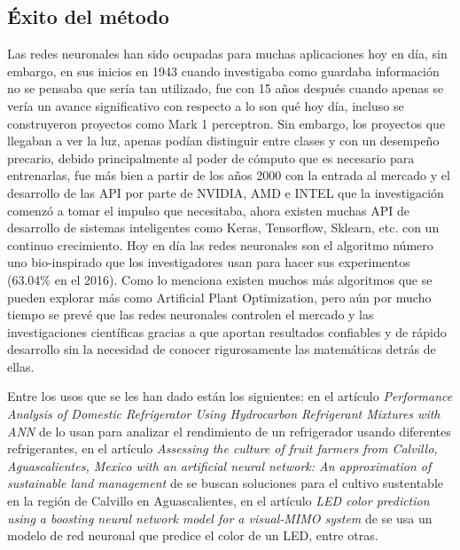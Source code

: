 \subsection{Éxito del método}

\par Las redes neuronales han sido ocupadas para muchas aplicaciones hoy en día, sin embargo, en sus inicios en 1943 cuando \textcite{mcculloch1943logical} investigaba como guardaba información no se pensaba que sería tan utilizado, fue con \textcite{rosenblatt1958perceptron} 15 años después cuando apenas se vería un avance significativo con respecto a lo son qué hoy día, incluso se construyeron proyectos como Mark 1 perceptron. Sin embargo, los proyectos que llegaban a ver la luz, apenas podían distinguir entre clases y con un desempeño precario, debido principalmente al poder de cómputo que es necesario para entrenarlas, fue más bien a partir de los años 2000 con la entrada al mercado y el desarrollo de las API por parte de NVIDIA, AMD e INTEL que la investigación comenzó a tomar el impulso que necesitaba, ahora existen muchas API de desarrollo de sistemas inteligentes como Keras, Tensorflow, Sklearn, etc. con un continuo crecimiento. Hoy en día las redes neuronales son el algoritmo número uno bio-inspirado que los investigadores usan para hacer sus experimentos (63.04\% en el 2016). Como lo menciona \textcite{kar2016bio} existen muchos más algoritmos que se pueden explorar más como Artificial Plant Optimization, pero aún por mucho tiempo se prevé que las redes neuronales controlen el mercado y las investigaciones científicas gracias a que aportan resultados confiables y de rápido desarrollo sin la necesidad de conocer rigurosamente las matemáticas detrás de ellas.

\par Entre los usos que se les han dado están los siguientes: en el artículo \textit{Performance Analysis of Domestic Refrigerator Using Hydrocarbon Refrigerant Mixtures with ANN} de \textcite{reddy2019performance} lo usan para analizar el rendimiento de un refrigerador usando diferentes refrigerantes, en el artículo \textit{Assessing the culture of fruit farmers from Calvillo, Aguascalientes, Mexico with an artificial neural network: An approximation of sustainable land management} de \textcite{santos2019assessing} se buscan soluciones para el cultivo sustentable en la región de Calvillo en Aguascalientes, en el artículo \textit{LED color prediction using a boosting neural network model for a visual-MIMO system} de \textcite{banik2018led} se usa un modelo de red neuronal que predice el color de un LED, entre otras.

